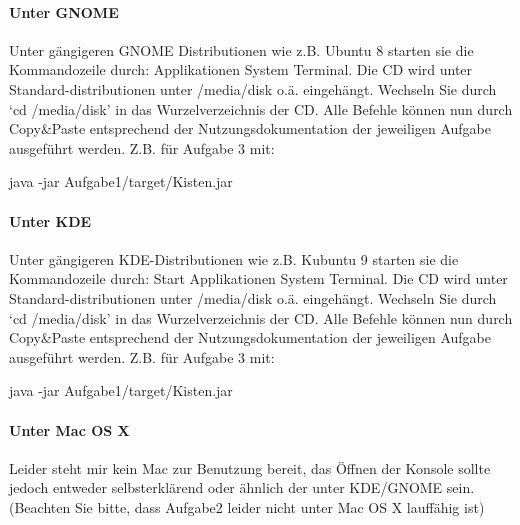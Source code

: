 \documentclass[a4paper,10pt]{scrartcl}
\theoremstyle{definition}
\theoremstyle{remark}
\begin{document}
\paragraph{Unter GNOME}
Unter gängigeren GNOME Distributionen wie z.B. Ubuntu 8 starten sie die Kommandozeile durch:
Applikationen \then System \then Terminal.
Die CD wird unter Standard-distributionen unter /media/disk o.ä. eingehängt. Wechseln Sie durch `cd /media/disk' in das Wurzelverzeichnis der CD.
Alle Befehle können nun durch Copy\&Paste entsprechend der Nutzungsdokumentation der jeweiligen Aufgabe ausgeführt werden. Z.B. für Aufgabe 3 mit:
\begin{center} java -jar Aufgabe1/target/Kisten.jar \end{center}
\paragraph{Unter KDE}
Unter gängigeren KDE-Distributionen wie z.B. Kubuntu 9 starten sie die Kommandozeile durch:
Start \then Applikationen \then System \then Terminal.
Die CD wird unter Standard-distributionen unter /media/disk o.ä. eingehängt. Wechseln Sie durch `cd /media/disk' in das Wurzelverzeichnis der CD.
Alle Befehle können nun durch Copy\&Paste entsprechend der Nutzungsdokumentation der jeweiligen Aufgabe ausgeführt werden. Z.B. für Aufgabe 3 mit:
\begin{center} java -jar Aufgabe1/target/Kisten.jar \end{center}
\paragraph{Unter Mac OS X}
Leider steht mir kein Mac zur Benutzung bereit, das Öffnen der Konsole sollte jedoch entweder selbsterklärend oder
ähnlich der unter KDE/GNOME sein. (Beachten Sie bitte, dass Aufgabe2 leider nicht unter Mac OS X lauffähig ist)

%


\end{document}
